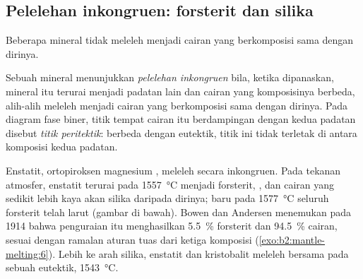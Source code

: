 \subsection*{Pelelehan inkongruen: forsterit dan silika}

Beberapa mineral tidak meleleh menjadi cairan yang berkomposisi sama dengan dirinya.

\begin{definition}\label{def:b2:mantle-melting:peritectic}
Sebuah mineral menunjukkan \emph{pelelehan inkongruen} bila,
ketika dipanaskan, mineral itu terurai menjadi padatan lain dan cairan yang
komposisinya berbeda, alih-alih meleleh menjadi cairan yang berkomposisi sama dengan dirinya. Pada diagram fase
biner, titik tempat cairan itu berdampingan dengan kedua padatan disebut
\emph{titik peritektik}: berbeda dengan eutektik, titik ini tidak terletak
di antara komposisi kedua padatan.
\end{definition}

Enstatit, ortopiroksen magnesium , meleleh secara inkongruen. Pada
tekanan atmosfer, enstatit terurai pada \qty{1557}{\celsius} menjadi forsterit,
, dan cairan yang sedikit lebih kaya akan silika daripada dirinya; baru pada
\qty{1577}{\celsius} seluruh forsterit telah larut (gambar di bawah). Bowen
dan Andersen menemukan pada 1914 bahwa penguraian itu menghasilkan \qty{5.5}{\percent}
forsterit dan \qty{94.5}{\percent} cairan, sesuai dengan ramalan aturan tuas dari
ketiga komposisi (\cref{exo:b2:mantle-melting:6}). Lebih ke arah silika, enstatit dan
kristobalit meleleh bersama pada sebuah eutektik, \qty{1543}{\celsius}.

